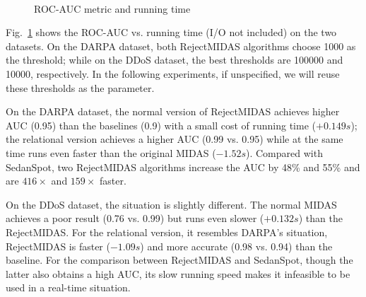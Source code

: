 \documentclass[5p]{elsarticle}
\begin{document}
	\begin{figure}[!htb]
		\centering
		 \\
		\caption{ROC-AUC metric and running time}\label{fig:TimeAUC.Darpa}
	\end{figure}

	Fig.~\ref{fig:TimeAUC.Darpa} shows the ROC-AUC vs. running time (I/O not included) on the two datasets. On the DARPA dataset, both RejectMIDAS algorithms choose 1000 as the threshold; while on the DDoS dataset, the best thresholds are 100000 and 10000, respectively. In the following experiments, if unspecified, we will reuse these thresholds as the parameter.

	On the DARPA dataset, the normal version of RejectMIDAS achieves higher AUC (0.95) than the baselines (0.9) with a small cost of running time ($+0.149s$); the relational version achieves a higher AUC (0.99 vs. 0.95) while at the same time runs even faster than the original MIDAS ($-1.52s$). Compared with SedanSpot, two RejectMIDAS algorithms increase the AUC by 48\% and 55\% and are $416\times$ and $159\times$ faster.

	On the DDoS dataset, the situation is slightly different. The normal MIDAS achieves a poor result (0.76 vs. 0.99) but runs even slower ($+0.132s$) than the RejectMIDAS. For the relational version, it resembles DARPA's situation, RejectMIDAS is faster ($-1.09s$) and more accurate (0.98 vs. 0.94) than the baseline. For the comparison between RejectMIDAS and SedanSpot, though the latter also obtains a high AUC, its slow running speed makes it infeasible to be used in a real-time situation.
\end{document}
